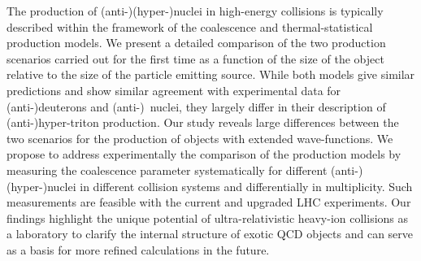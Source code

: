 The production of (anti-)(hyper-)nuclei in high-energy collisions is typically described within the framework of
the coalescence and thermal-statistical production models. 
We present a detailed comparison of the two production scenarios carried out for the first time as a function of the size of the object relative to the size of the particle emitting source. 
While both models give similar predictions and show similar agreement with experimental data for (anti-)deuterons and (anti-)\hethree\ nuclei,  they largely differ in their description of (anti-)hyper-triton production.
Our study reveals large differences between the two scenarios for the production of objects with extended wave-functions. 
We propose to address experimentally the comparison of the production models by measuring the coalescence parameter systematically for different (anti-)(hyper-)nuclei in different collision systems and differentially in multiplicity. 
Such measurements are feasible with the current and upgraded LHC experiments. 
Our findings highlight the unique potential of ultra-relativistic heavy-ion collisions as a laboratory to clarify the internal structure of exotic QCD objects and can serve as a basis for more refined calculations in the future.
